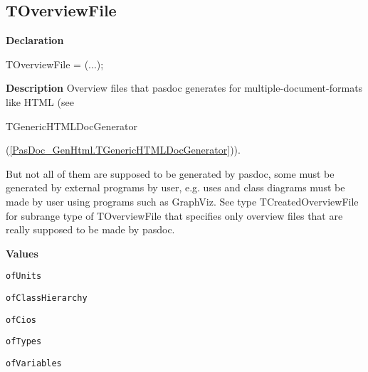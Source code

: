 \documentclass{report}
\newif\ifpdf
\begin{document}
\subsection*{TOverviewFile}
\fi
\label{PasDoc_Gen-TOverviewFile}
\begin{list}{}{
\setlength{\itemindent}{0cm}
\setlength{\listparindent}{0cm}
\setlength{\leftmargin}{\evensidemargin}
\addtolength{\leftmargin}{\tmplength}
\settowidth{\labelsep}{X}
\addtolength{\leftmargin}{\labelsep}
\setlength{\labelwidth}{\tmplength}
}
\item[\textbf{Declaration}\hfill]
\ifpdf
\begin{flushleft}
\fi
\begin{ttfamily}
TOverviewFile = (...);\end{ttfamily}

\ifpdf
\end{flushleft}
\fi

\par
\item[\textbf{Description}]
Overview files that pasdoc generates for multiple{-}document{-}formats like HTML (see \begin{ttfamily}TGenericHTMLDocGenerator\end{ttfamily}(\ref{PasDoc_GenHtml.TGenericHTMLDocGenerator})).

But not all of them are supposed to be generated by pasdoc, some must be generated by external programs by user, e.g. uses and class diagrams must be made by user using programs such as GraphViz. See type TCreatedOverviewFile for subrange type of TOverviewFile that specifies only overview files that are really supposed to be made by pasdoc.\item[\textbf{Values}]
\begin{description}
\item[\texttt{ofUnits}] \label{PasDoc_Gen-ofUnits}
\index{}
 
\item[\texttt{ofClassHierarchy}] \label{PasDoc_Gen-ofClassHierarchy}
\index{}
 
\item[\texttt{ofCios}] \label{PasDoc_Gen-ofCios}
\index{}
 
\item[\texttt{ofTypes}] \label{PasDoc_Gen-ofTypes}
\index{}
 
\item[\texttt{ofVariables}] \label{PasDoc_Gen-ofVariables}
\index{}
 

\end{description}
\end{list}
\end{document}
